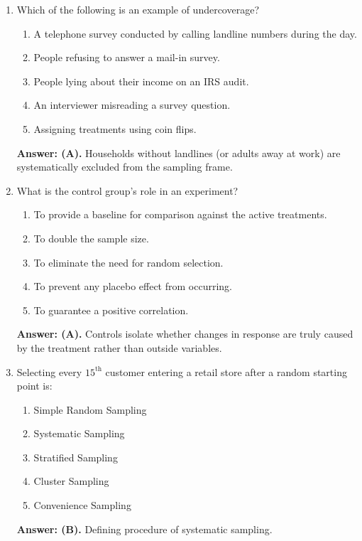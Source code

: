 \begin{enumerate}[resume, leftmargin=1.5em]
  \item Which of the following is an example of undercoverage?
  \begin{enumerate}[label=(\Alph*)]
    \item A telephone survey conducted by calling landline numbers during the day.
    \item People refusing to answer a mail-in survey.
    \item People lying about their income on an IRS audit.
    \item An interviewer misreading a survey question.
    \item Assigning treatments using coin flips.
  \end{enumerate}
  \textbf{Answer: (A).} Households without landlines (or adults away at work) are systematically excluded from the sampling frame.

  \item What is the control group's role in an experiment?
  \begin{enumerate}[label=(\Alph*)]
    \item To provide a baseline for comparison against the active treatments.
    \item To double the sample size.
    \item To eliminate the need for random selection.
    \item To prevent any placebo effect from occurring.
    \item To guarantee a positive correlation.
  \end{enumerate}
  \textbf{Answer: (A).} Controls isolate whether changes in response are truly caused by the treatment rather than outside variables.

  \item Selecting every $15^{\text{th}}$ customer entering a retail store after a random starting point is:
  \begin{enumerate}[label=(\Alph*)]
    \item Simple Random Sampling \item Systematic Sampling \item Stratified Sampling \item Cluster Sampling \item Convenience Sampling
  \end{enumerate}
  \textbf{Answer: (B).} Defining procedure of systematic sampling.


\end{enumerate}
